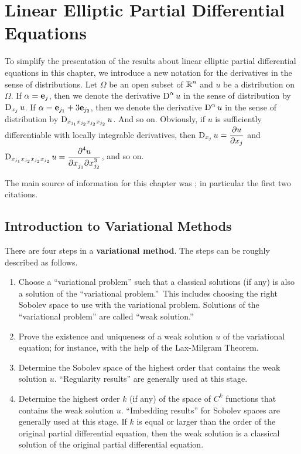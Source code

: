 \chapter{Linear Elliptic Partial Differential Equations}
\label{elliptic_PDEs}

To simplify the presentation of the results about linear elliptic partial
differential equations in this chapter, we introduce a new notation
for the derivatives in the sense of distributions. Let $\Omega$ be an
open subset of $\displaystyle \RR^n$ and $u$ be a distribution on $\Omega$.  If
$\alpha = \VEC{e}_j$, then we denote the derivative
$\diff^\alpha u$ in the sense of distribution by $\diff_{x_j} u$.  If
$\alpha = \VEC{e}_{j_1} + 3 \VEC{e}_{j_2}$,
then we denote the derivative $\displaystyle \diff^\alpha u$ in the
sense of distribution by $\diff_{x_{j_1}x_{j_2}x_{j_2}x_{j_2}} u$.  And so on.
Obviously, if $u$ is sufficiently differentiable with locally
integrable derivatives, then $\displaystyle \diff_{x_j} u = \pdydx{u}{x_j}$
and $\displaystyle \diff_{x_{j_1}x_{j_2}x_{j_2}x_{j_2}} u
= \pdydxnm{u}{x_{j_1}}{x_{j_2}}{4}{}{3}$, and so on.

The main source of information for this chapter was
\cite{Br,FoPDE,RenRog,Tr}; in particular the first two
citations.

\section{Introduction to Variational Methods}

There are four steps in a {\bfseries variational method}.  The steps
can be roughly described as follows.
\begin{enumerate}
\item Choose a ``variational problem'' such that a
classical solutions (if any) is also a solution of the
``variational problem.''\  This includes choosing the right Sobolev
space to use with the variational problem.  Solutions of the
``variational problem'' are called ``weak solution.''
\item Prove the existence and uniqueness of a weak solution $u$ of the
variational equation; for instance, with the help of the Lax-Milgram Theorem.
\item \label{ell_wsd1} Determine the Sobolev space of the highest
order that contains the weak solution $u$.  ``Regularity results''
are generally used at this stage.
\item Determine the highest order $k$ (if any) of the space of
$\displaystyle C^k$ functions that contains the weak solution $u$.
``Imbedding results'' for Sobolev spaces are generally used at this stage.
If $k$ is equal or larger than the order of the original partial
differential equation, then the weak solution is a classical solution
of the original partial differential equation.
\end{enumerate}


